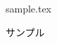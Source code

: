 \documentclass{jlreq}
\title{}
\author{森}
\date{}
\begin{document}
\maketitle
  
{sample.tex}
  
\begin{thebibliography}{99}
    サンプル
\end{thebibliography}
  
\end{document}
